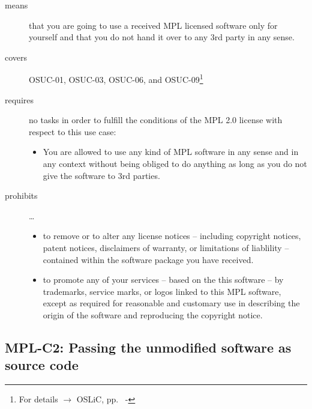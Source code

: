 \begin{description}

\item[means] that you are going to use a received MPL licensed software only
for yourself and that you do not hand it over to any 3rd party in any sense.

\item[covers] OSUC-01, OSUC-03, OSUC-06, and OSUC-09\footnote{For details 
$\rightarrow$ OSLiC, pp.\ \pageref{OSUC-01-DEF} - \pageref{OSUC-09-DEF}}

\item[requires] no tasks in order to fulfill the conditions of the MPL 2.0
license with respect to this use case:
  \begin{itemize}
    \item You are allowed to use any kind of MPL software in any sense and in
    any context without being obliged to do anything as long as you do not
    give the software to 3rd parties.
  \end{itemize}

\item[prohibits] \ldots
\begin{itemize}
  \item to remove or to alter any license notices -- including copyright
  notices, patent notices, disclaimers of warranty, or limitations of liablility
  -- contained within the software package you have received.
  \item to promote any of your services -- based on the this software -- by
  trademarks, service marks, or logos linked to this MPL software, except as 
  required for reasonable and customary use in describing the origin
  of the software and reproducing the  copyright notice.
\end{itemize}

\end{description}

\subsection{MPL-C2: Passing the unmodified software as source code}
\label{OSUC-02S-MPL} \label{OSUC-05S-MPL} \label{OSUC-07S-MPL} 

